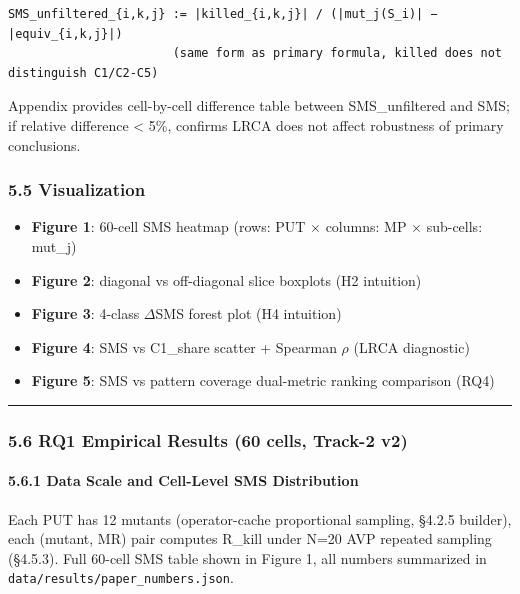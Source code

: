 \documentclass[review,12pt,authoryear]{elsarticle}
\providecommand{\tightlist}{\setlength{\itemsep}{0pt}\setlength{\parskip}{0pt}}
\begin{document}
\begin{verbatim}
SMS_unfiltered_{i,k,j} := |killed_{i,k,j}| / (|mut_j(S_i)| − |equiv_{i,k,j}|)
                       (same form as primary formula, killed does not distinguish C1/C2-C5)
\end{verbatim}

Appendix provides cell-by-cell difference table between SMS\_unfiltered
and SMS; if relative difference \textless{} 5\%, confirms LRCA does not
affect robustness of primary conclusions.

\subsubsection{5.5 Visualization}\label{visualization}

\begin{itemize}
\tightlist
\item
  \textbf{Figure 1}: 60-cell SMS heatmap (rows: PUT $\times$ columns: MP $\times$
  sub-cells: mut\_j)
\item
  \textbf{Figure 2}: diagonal vs off-diagonal slice boxplots (H2
  intuition)
\item
  \textbf{Figure 3}: 4-class $\Delta$SMS forest plot (H4 intuition)
\item
  \textbf{Figure 4}: SMS vs C1\_share scatter + Spearman $\rho$ (LRCA
  diagnostic)
\item
  \textbf{Figure 5}: SMS vs pattern coverage dual-metric ranking
  comparison (RQ4)
\end{itemize}

\begin{center}\rule{0.5\linewidth}{0.5pt}\end{center}

\subsubsection{5.6 RQ1 Empirical Results (60 cells, Track-2
v2)}\label{rq1-empirical-results-60-cells-track-2-v2}

\paragraph{5.6.1 Data Scale and Cell-Level SMS
Distribution}\label{data-scale-and-cell-level-sms-distribution}

Each PUT has 12 mutants (operator-cache proportional sampling, §4.2.5
builder), each (mutant, MR) pair computes R\_kill under N=20 AVP
repeated sampling (§4.5.3). Full 60-cell SMS table shown in Figure 1,
all numbers summarized in \texttt{data/results/paper\_numbers.json}.
\end{document}
